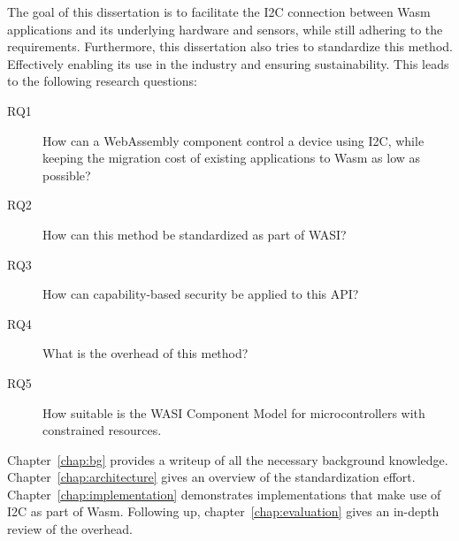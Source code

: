 The goal of this dissertation is to facilitate the \gls{I2C} connection between \gls{Wasm} applications and its underlying hardware and sensors, while still adhering to the requirements. Furthermore, this dissertation also tries to standardize this method. Effectively enabling its use in the industry and ensuring sustainability. This leads to the following research questions:

\begin{description}
    \item[RQ1] How can a WebAssembly component control a device using I2C, while keeping the migration cost of existing applications to Wasm as low as possible?
    \item[RQ2] How can this method be standardized as part of WASI?
    \item[RQ3] How can capability-based security be applied to this API?
    \item[RQ4] What is the overhead of this method?
    \item[RQ5] How suitable is the \gls{WASI} Component Model for microcontrollers with constrained resources.
\end{description}

Chapter~\ref{chap:bg} provides a writeup of all the necessary background knowledge. Chapter~\ref{chap:architecture} gives an overview of the standardization effort. Chapter~\ref{chap:implementation} demonstrates implementations that make use of I2C as part of Wasm. Following up, chapter~\ref{chap:evaluation} gives an in-depth review of the overhead. 
